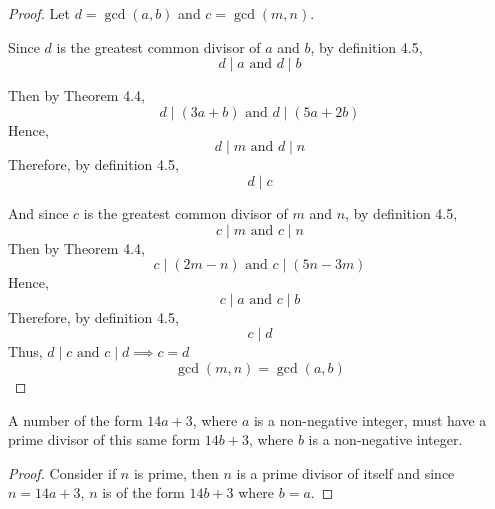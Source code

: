\documentclass{tufte-handout}
\begin{document}
\begin{question}


\begin{proof}

Let \( d = \gcd(a,b) \) and \( c = \gcd(m,n) \).

Since \( d \) is the greatest common divisor of \( a \) and \( b \), by definition 4.5,
\[ d \mid a \text{ and } d \mid b \]

Then by Theorem 4.4,
\[ d \mid (3a + b) \text{ and } d \mid (5a + 2b) \]
Hence,
\[ d \mid m \text{ and } d \mid n \]
Therefore, by definition 4.5,
\[ d \mid c \]  

And since \( c \) is the greatest common divisor of \( m \) and \( n \), by definition 4.5,
\[ c \mid m \text{ and } c \mid n \]
Then by Theorem 4.4,
\[ c \mid (2m - n) \text{ and } c \mid (5n - 3m) \]
Hence,
\[ c \mid a \text{ and } c \mid b \]
Therefore, by definition 4.5,
\[ c \mid d \]
Thus, \( d \mid c \text{ and } c \mid d \implies c = d \)
\[ \gcd(m,n) = \gcd(a,b) \]

\end{proof}

\vspace{5cm}

\qpart

A number of the form \( 14a + 3 \), where \( a \) is a non-negative integer, must have a prime
divisor of this same form \( 14b + 3 \), where \( b \) is a non-negative integer.


\begin{proof}

    Consider if \( n \) is prime, then \( n \) is a prime divisor of itself and since
    \( n = 14a + 3 \), \( n \) is of the form \( 14b + 3 \) where \( b = a \).


\end{proof}
\end{question}
\end{document}
